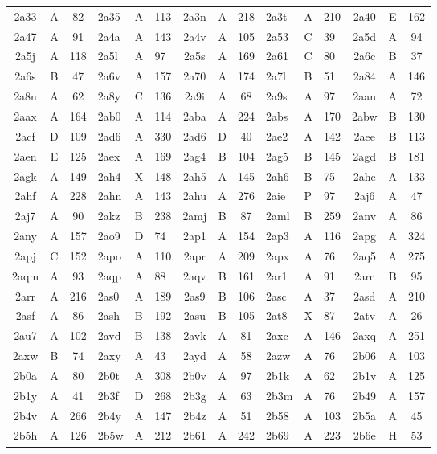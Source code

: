\begin{longtable}{|c|c|c| a|a|a| c|c|c| a|a|a| c|c|c|}
2a33 & A & 82 & 2a35 & A & 113 & 2a3n & A & 218 & 2a3t & A & 210 & 2a40 & E & 162\\
2a47 & A & 91 & 2a4a & A & 143 & 2a4v & A & 105 & 2a53 & C & 39 & 2a5d & A & 94\\
2a5j & A & 118 & 2a5l & A & 97 & 2a5s & A & 169 & 2a61 & C & 80 & 2a6c & B & 37\\
2a6s & B & 47 & 2a6v & A & 157 & 2a70 & A & 174 & 2a7l & B & 51 & 2a84 & A & 146\\
2a8n & A & 62 & 2a8y & C & 136 & 2a9i & A & 68 & 2a9s & A & 97 & 2aan & A & 72\\
2aax & A & 164 & 2ab0 & A & 114 & 2aba & A & 224 & 2abs & A & 170 & 2abw & B & 130\\
2acf & D & 109 & 2ad6 & A & 330 & 2ad6 & D & 40 & 2ae2 & A & 142 & 2aee & B & 113\\
2aen & E & 125 & 2aex & A & 169 & 2ag4 & B & 104 & 2ag5 & B & 145 & 2agd & B & 181\\
2agk & A & 149 & 2ah4 & X & 148 & 2ah5 & A & 145 & 2ah6 & B & 75 & 2ahe & A & 133\\
2ahf & A & 228 & 2ahn & A & 143 & 2ahu & A & 276 & 2aie & P & 97 & 2aj6 & A & 47\\
2aj7 & A & 90 & 2akz & B & 238 & 2amj & B & 87 & 2aml & B & 259 & 2anv & A & 86\\
2any & A & 157 & 2ao9 & D & 74 & 2ap1 & A & 154 & 2ap3 & A & 116 & 2apg & A & 324\\
2apj & C & 152 & 2apo & A & 110 & 2apr & A & 209 & 2apx & A & 76 & 2aq5 & A & 275\\
2aqm & A & 93 & 2aqp & A & 88 & 2aqv & B & 161 & 2ar1 & A & 91 & 2arc & B & 95\\
2arr & A & 216 & 2as0 & A & 189 & 2as9 & B & 106 & 2asc & A & 37 & 2asd & A & 210\\
2asf & A & 86 & 2ash & B & 192 & 2asu & B & 105 & 2at8 & X & 87 & 2atv & A & 26\\
2au7 & A & 102 & 2avd & B & 138 & 2avk & A & 81 & 2axc & A & 146 & 2axq & A & 251\\
2axw & B & 74 & 2axy & A & 43 & 2ayd & A & 58 & 2azw & A & 76 & 2b06 & A & 103\\
2b0a & A & 80 & 2b0t & A & 308 & 2b0v & A & 97 & 2b1k & A & 62 & 2b1v & A & 125\\
2b1y & A & 41 & 2b3f & D & 268 & 2b3g & A & 63 & 2b3m & A & 76 & 2b49 & A & 157\\
2b4v & A & 266 & 2b4y & A & 147 & 2b4z & A & 51 & 2b58 & A & 103 & 2b5a & A & 45\\
2b5h & A & 126 & 2b5w & A & 212 & 2b61 & A & 242 & 2b69 & A & 223 & 2b6e & H & 53\\

\end{longtable}
